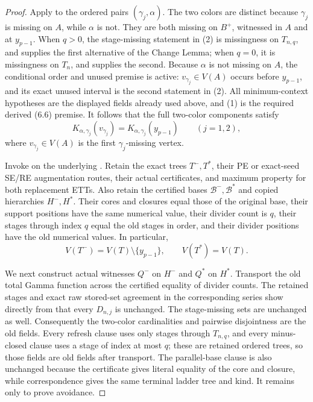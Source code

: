 \begin{proof}
Apply  to the ordered pairs
\((\gamma_j,\alpha)\).  The two colors are distinct because
\(\gamma_j\) is missing on \(A\), while \(\alpha\) is not.  They are
both missing on \(B^+\), witnessed in \(A\) and at \(y_{p-1}\).
When \(q>0\), the stage-missing statement in (2) is missingness on
\(T_{n,q}\), and supplies the first alternative of the Change Lemma;
when \(q=0\), it is missingness on \(T_n\), and supplies the second.
Because \(\alpha\) is not missing on \(A\), the conditional order and
unused premise is active: \(v_{\gamma_j}\in V(A)\) occurs before
\(y_{p-1}\), and its exact unused interval is the second statement in
(2).  All minimum-context hypotheses are the displayed fields already
used above, and (1) is the required derived (6.6) premise.
It follows that the full two-color components satisfy
\[
 K_{\alpha,\gamma_j}(v_{\gamma_j})
      =K_{\alpha,\gamma_j}(y_{p-1})\qquad(j=1,2),              \tag{3}
\]
where \(v_{\gamma_j}\in V(A)\) is the first
\(\gamma_j\)-missing vertex.

Invoke  on the
underlying .  Retain the exact
trees \(T^-,T^*\), their PE or exact-seed SE/RE augmentation routes,
their actual 
certificates, and maximum property for both replacement ETTs.  Also
retain the certified bases \(\mathcal B^-,\mathcal B^*\) and copied
hierarchies \(H^-,H^*\).  Their cores and closures equal those of the
original base, their support positions have the same numerical value,
their divider count is \(q\), their stages through index \(q\) equal the
old stages in order, and their divider positions have the old numerical
values.  In particular,
\[
 V(T^-)=V(T)\setminus\{y_{p-1}\},\qquad V(T^*)=V(T).          \tag{4}
\]

We next construct actual  witnesses
\(Q^-\) on \(H^-\) and \(Q^*\) on \(H^*\).  Transport the old total
Gamma function across the certified equality of divider counts.  The
retained stages and exact raw stored-set agreement in the corresponding
series show directly from  that every
\(D_{n,j}\) is unchanged.  The stage-missing sets are unchanged as well.
Consequently the two-color cardinalities and pairwise disjointness are
the old fields.  Every refresh clause uses only stages through
\(T_{n,q}\), and every minus-closed clause uses a stage of index at most
\(q\); these are retained ordered trees, so those fields are old fields
after transport.  The parallel-base clause is also unchanged because
the certificate gives literal equality of the core and closure, while
correspondence gives the same terminal ladder tree and kind.  It remains
only to prove avoidance.


\end{proof}
